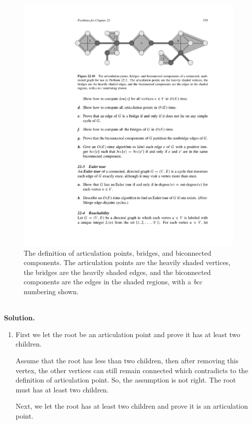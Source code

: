 \documentclass[12pt,a4paper]{article}
\theoremstyle{definition}
\begin{document}
\begin{enumerate}
\begin{figure}[htbp]
	\centering
	\includegraphics[width=6in]{Fig-Definition.pdf}
	\caption{The definition of articulation points, bridges, and biconnected components. The articulation points are the heavily shaded vertices, the bridges are the heavily shaded edges, and the biconnected components are the edges in the shaded regions, with a \textit{bcc} numbering shown.}
	\label{def}
\end{figure}

~\\
\textbf{Solution.}

\begin{enumerate}
	\item First we let the root be an articulation point and prove it has at least two children.
	
	Assume that the root has less than two children, then after removing this vertex, the other vertices can still remain connected which contradicts to the definition of articulation point. So, the assumption is not right. The root must has at least two children.
	
	Next, we let the root has at least two children and prove it is an articulation point.
	

\end{enumerate}
\end{enumerate}
\end{document}
